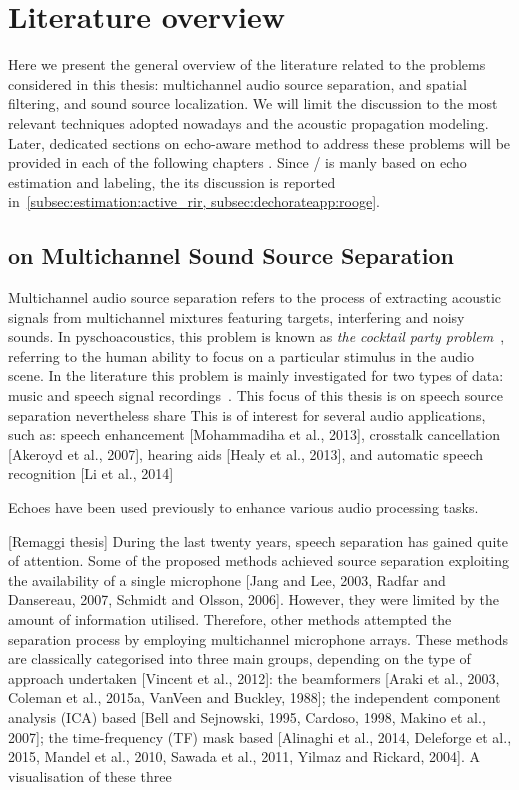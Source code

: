 \section{Literature overview}\label{sec:application:sota}
Here we present the general overview of the literature related to the problems considered in this thesis: multichannel audio source separation, and spatial filtering, and sound source localization.
We will limit the discussion to the most relevant techniques adopted nowadays and the acoustic propagation modeling.
Later, dedicated sections on echo-aware method to address these problems will be provided in each of the following chapters .
Since \RooGE/ is manly based on echo estimation and labeling, the its discussion is reported in~\cref{subsec:estimation:active_rir, subsec:dechorateapp:rooge}.

\subsection{on Multichannel Sound Source Separation}
Multichannel audio source separation refers to the process of extracting acoustic signals from multichannel mixtures featuring targets, interfering and noisy sounds.
In pyschoacoustics, this problem is known as \textit{the cocktail party problem}~, referring to the human ability to focus on a particular stimulus in the audio scene.
In the literature this problem is mainly investigated for two types of data: music and speech signal recordings~\citeonly{[Vincent et al., 2012]}.
This focus of this thesis is on speech source separation nevertheless share
This is of interest for several audio applications, such as: speech enhancement [Mohammadiha et al., 2013], crosstalk cancellation [Akeroyd et al., 2007], hearing aids [Healy et al., 2013], and automatic speech recognition [Li et al., 2014]

Echoes have been used previously to enhance various audio processing tasks.

[Remaggi thesis]
During the last twenty years, speech separation has gained quite of attention. Some of the proposed methods achieved source separation exploiting the availability of a single microphone [Jang and Lee, 2003, Radfar and Dansereau, 2007, Schmidt and Olsson, 2006]. However, they were limited by the amount of information utilised. Therefore, other methods attempted the separation process by employing multichannel microphone arrays. These methods are classically categorised into three main groups, depending on the type of approach undertaken [Vincent et al., 2012]: the beamformers [Araki et al., 2003, Coleman et al., 2015a, VanVeen and Buckley, 1988]; the independent component analysis (ICA) based [Bell and Sejnowski, 1995, Cardoso, 1998, Makino et al., 2007]; the time-frequency (TF) mask based [Alinaghi et al., 2014, Deleforge et al., 2015, Mandel et al., 2010, Sawada et al., 2011, Yilmaz and Rickard, 2004]. A visualisation of these three


